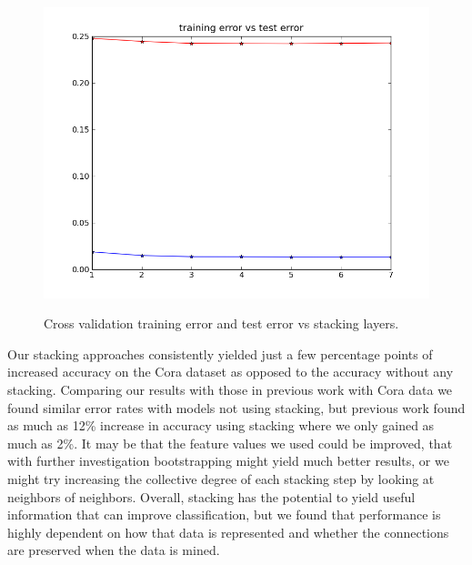 \documentclass[a4paper,11pt]{article}
\begin{document}
\begin{figure}[!ht]
  \caption{Cross validation training error and test error vs stacking layers.}
  \centering
  \includegraphics[width=4.5in]{WU5/CrossValidation.png}
  \label{figures:f3}
\end{figure}

\newpage

Our stacking approaches consistently yielded just a few percentage points of
increased accuracy on the Cora dataset as opposed to the accuracy without any stacking. 
Comparing our results with those in previous work with Cora data \footnotemark[\value{footnote}]
we found similar error rates with models not using stacking, but previous work found as much as
12\% increase in accuracy using stacking where we only gained as much as 2\%. It may be that the
feature values we used could be improved, that with further investigation bootstrapping might yield
much better results, or we might try increasing the collective degree of each stacking step by 
looking at neighbors of neighbors. Overall, stacking has the potential to yield useful information
that can improve classification, but we found that performance is highly dependent on how that data is represented and whether
the connections are preserved when the data is mined.
\end{document}
